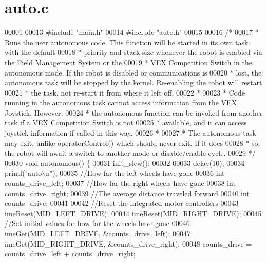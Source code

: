 \section{auto.\+c}
\label{auto_8c_source}

\begin{DoxyCode}
00001 
00013 \textcolor{preprocessor}{#include "main.h"}
00014 \textcolor{preprocessor}{#include "auto.h"}
00015 
00016 \textcolor{comment}{/*}
00017 \textcolor{comment}{ * Runs the user autonomous code. This function will be started in its own task with the default}
00018 \textcolor{comment}{ * priority and stack size whenever the robot is enabled via the Field Management System or the}
00019 \textcolor{comment}{ * VEX Competition Switch in the autonomous mode. If the robot is disabled or communications is}
00020 \textcolor{comment}{ * lost,  the autonomous task will be stopped by the kernel. Re-enabling the robot will restart}
00021 \textcolor{comment}{ * the task, not re-start it from where it left off.}
00022 \textcolor{comment}{ *}
00023 \textcolor{comment}{ * Code running in the autonomous task cannot access information from the VEX Joystick. However,}
00024 \textcolor{comment}{ * the autonomous function can be invoked from another task if a VEX Competition Switch is not}
00025 \textcolor{comment}{ * available, and it can access joystick information if called in this way.}
00026 \textcolor{comment}{ *}
00027 \textcolor{comment}{ * The autonomous task may exit, unlike operatorControl() which should never exit. If it does}
00028 \textcolor{comment}{ * so, the robot will await a switch to another mode or disable/enable cycle.}
00029 \textcolor{comment}{ */}
00030 \textcolor{keywordtype}{void} autonomous() \{
00031   init_slew();
00032 
00033   delay(10);
00034   printf(\textcolor{stringliteral}{"auto\(\backslash\)n"});
00035   \textcolor{comment}{//How far the left wheels have gone}
00036   \textcolor{keywordtype}{int} counts\_drive\_left;
00037   \textcolor{comment}{//How far the right wheels have gone}
00038   \textcolor{keywordtype}{int} counts\_drive\_right;
00039   \textcolor{comment}{//The average distance traveled forward}
00040   \textcolor{keywordtype}{int} counts\_drive;
00041 
00042   \textcolor{comment}{//Reset the integrated motor controllers}
00043   imeReset(MID_LEFT_DRIVE);
00044   imeReset(MID_RIGHT_DRIVE);
00045   \textcolor{comment}{//Set initial values for how far the wheels have gone}
00046   imeGet(MID_LEFT_DRIVE, &counts\_drive\_left);
00047   imeGet(MID_RIGHT_DRIVE, &counts\_drive\_right);
00048   counts\_drive = counts\_drive\_left + counts\_drive\_right;

\end{DoxyCode}
